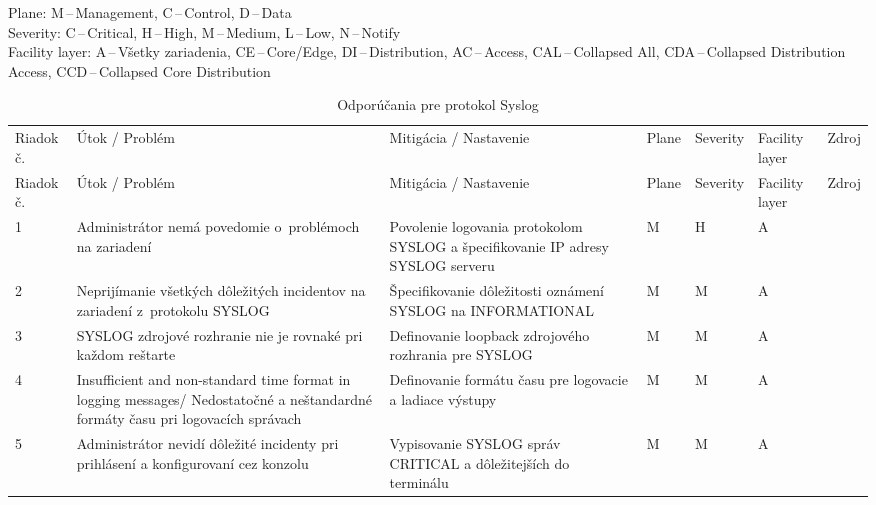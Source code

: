 \vspace{-1em}
{\tiny 
	\noindent
	Plane: M\,--\,Management, C\,--\,Control, D\,--\,Data\\
	Severity: C\,--\,Critical, H\,--\,High, M\,--\,Medium, L\,--\,Low, N\,--\,Notify\\
	Facility layer: A\,--\,Všetky zariadenia, CE\,--\,Core/Edge, DI\,--\,Distribution, AC\,--\,Access, CAL\,--\,Collapsed All, CDA\,--\,Collapsed Distribution Access, CCD\,--\,Collapsed Core Distribution}

\begin{longtable}[!htbp]{|C{2.5em}L{11em}L{11em}C{2.5em}C{4em}C{5em}L{2.5em}|}
	
	\caption{Odporúčania pre protokol Syslog}
	\label{tab:syslog}\\ \hline
	\mbox{Riadok} č.&Útok / Problém	&Mitigácia / Nastavenie	&Plane	&Severity	&Facility layer	&Zdroj\\ \hhline{=======}
	\endfirsthead 
	\hline
	\centering
	
	Riadok č.	&Útok / Problém	&Mitigácia / Nastavenie	&Plane	&Severity	&Facility layer	&Zdroj\\ \hhline{=======}
	\endhead
	
	 1	&Administrátor nemá povedomie o~problémoch na zariadení	&Povolenie logovania protokolom SYSLOG a špecifikovanie IP adresy SYSLOG serveru	&M	&H	&A	& \cite{CIS_DrTLsgXv24lxeIIM}
	
	\cite{Graesser2001}\\
	2	&Neprijímanie všetkých dôležitých incidentov na zariadení z~protokolu SYSLOG	&Špecifikovanie dôležitosti oznámení SYSLOG na INFORMATIONAL	&M	&M	&A	& \cite{CIS_DrTLsgXv24lxeIIM}\\
	 3	&SYSLOG zdrojové rozhranie nie je rovnaké pri každom reštarte	& Definovanie loopback zdrojového rozhrania pre SYSLOG	&M	&M	&A	& \cite{Singh2018}
	
	\cite{CIS_DrTLsgXv24lxeIIM}\\
	4	&Insufficient and non-standard  time format in logging messages/ Nedostatočné a neštandardné formáty času pri logovacích správach	&Definovanie formátu času pre logovacie a ladiace výstupy	&M	&M	&A	& \cite{CIS_DrTLsgXv24lxeIIM}
	
	\cite{Graesser2001}\\
	 5	&Administrátor nevidí dôležité incidenty pri prihlásení a konfigurovaní cez konzolu	&Vypisovanie SYSLOG správ CRITICAL a dôležitejších do terminálu	&M	&M	&A	& \cite{Singh2018}
	

\end{longtable}
